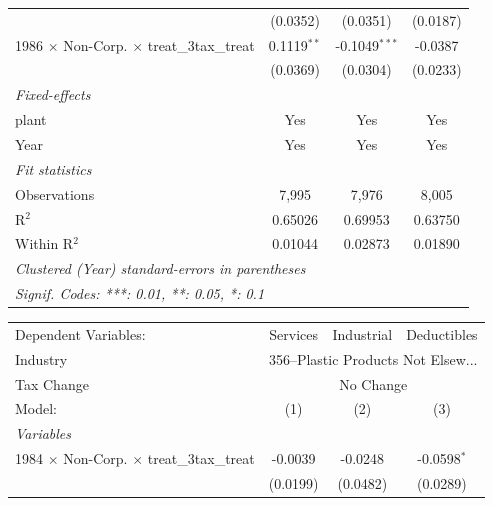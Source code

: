 \documentclass[
  12pt]{article}
\theoremstyle{definition}
\theoremstyle{remark}
\begin{document}
\begin{table}
\begin{minipage}{\linewidth}
\begin{tabular}{lccc}
                                                           & (0.0352)        & (0.0351)        & (0.0187)\\   
   1986 $\times$ Non-Corp. $\times$ treat\_3tax\_treat     & 0.1119$^{**}$   & -0.1049$^{***}$ & -0.0387\\   
                                                           & (0.0369)        & (0.0304)        & (0.0233)\\   
   \midrule
   \emph{Fixed-effects}\\
   plant                                                   & Yes             & Yes             & Yes\\  
   Year                                                    & Yes             & Yes             & Yes\\  
   \midrule
   \emph{Fit statistics}\\
   Observations                                            & 7,995           & 7,976           & 8,005\\  
   R$^2$                                                   & 0.65026         & 0.69953         & 0.63750\\  
   Within R$^2$                                            & 0.01044         & 0.02873         & 0.01890\\  
   \midrule \midrule
   \multicolumn{4}{l}{\emph{Clustered (Year) standard-errors in parentheses}}\\
   \multicolumn{4}{l}{\emph{Signif. Codes: ***: 0.01, **: 0.05, *: 0.1}}\\
\end{tabular}
\par\endgroup
\begingroup
\centering
\begin{tabular}{lccc}
   \tabularnewline \midrule \midrule
   Dependent Variables:                                    & Services       & Industrial    & Deductibles\\  
   Industry & \multicolumn{3}{c}{356–Plastic Products Not Elsew...} \\ 
   Tax Change & \multicolumn{3}{c}{No Change} \\ 
   Model:                                                  & (1)            & (2)           & (3)\\  
   \midrule
   \emph{Variables}\\
   1984 $\times$ Non-Corp. $\times$ treat\_3tax\_treat     & -0.0039        & -0.0248       & -0.0598$^{*}$\\   
                                                           & (0.0199)       & (0.0482)      & (0.0289)\\   

\end{tabular}
\end{minipage}
\end{table}
\end{document}
